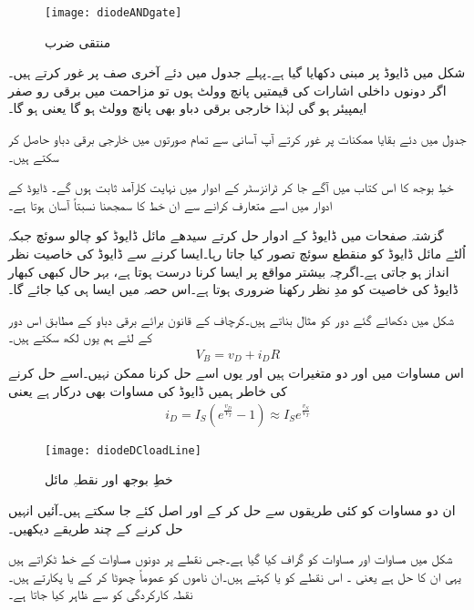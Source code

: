 \begin{figure}
\centering
\texttt{[image: diodeANDgate]}
\caption{منتقی ضرب}
\label{شکل_منتقی_ضرب}
\end{figure}
شکل  میں ڈایوڈ   پر مبنی   دکھایا گیا ہے۔پہلے جدول میں دئے آخری صف پر غور کرتے ہیں۔اگر دونوں داخلی اشارات کی قیمتیں پانچ وولٹ  ہوں تو مزاحمت میں برقی رو صفر ایمپیئر ہو گی لہٰذا خارجی برقی دباو بھی پانچ وولٹ ہو گا یعنی  ہو گا۔

جدول میں دئے بقایا ممکنات پر غور کرتے آپ آسانی سے تمام صورتوں میں خارجی برقی دباو حاصل کر سکتے ہیں۔


 \label{حصہ_یکسمتی_برقی_بار_کا_خط}
	خطِ بوجھ کا اس کتاب میں آگے جا کر ٹرانزسٹر کے ادوار میں  نہایت کارآمد ثابت ہوں گے۔ ڈایوڈ کے ادوار میں اسے متعارف کرانے سے ان خط کا سمجھنا نسبتاً آسان ہوتا ہے۔

گزشتہ صفحات میں ڈایوڈ کے ادوار حل کرتے سیدھے مائل ڈایوڈ کو چالو سوئچ جبکہ اُلٹے مائل ڈایوڈ کو منقطع سوئچ تصور کیا جاتا رہا۔ایسا کرنے سے ڈایوڈ کی خاصیت نظر انداز ہو جاتی ہے۔اگرچہ بیشتر مواقع پر ایسا کرنا درست ہوتا ہے، بہر حال کبھی کبھار ڈایوڈ کی خاصیت کو مدِ نظر رکھنا ضروری ہوتا ہے۔اس حصہ میں ایسا ہی کیا جائے گا۔

شکل   میں دکھائے گئے دور کو مثال بناتے ہیں۔کرچاف کے قانون برائے برقی دباو کے مطابق اس دور کے لئے ہم یوں لکھ سکتے ہیں۔
\begin{align} \label{مساوات_ڈایوڈ_بار_کا_خط}
V_B=v_D+i_D R
\end{align}
اس مساوات میں  اور  دو متغیرات ہیں اور یوں اسے حل کرنا ممکن نہیں۔اسے حل کرنے کی خاطر ہمیں ڈایوڈ کی مساوات بھی درکار ہے یعنی
\begin{align} \label{مساوات_ڈایوڈ_کا_خط_جس_پر_بار_لدا_جائے}
i_D=I_S \left (e^{\frac{v_D}{V_T}}-1 \right ) \approx I_S e^{\frac{v_S}{V_T}}
\end{align}
%
\begin{figure}
\centering
\texttt{[image: diodeDCloadLine]}
\caption{ خطِ بوجھ اور نقطہِ مائل}
\label{شکل_ڈایوڈ_بار_کا_خط}
\end{figure}
	ان دو مساوات کو کئی طریقوں سے حل کر کے  اور  اصل کئے جا سکتے ہیں۔آئیں انہیں حل کرنے کے چند طریقے دیکھیں۔

شکل  میں مساوات   اور مساوات   کو گراف کیا گیا ہے۔جس نقطے پر دونوں مساوات کے خط ٹکراتے ہیں یہی ان کا حل ہے یعنی ۔ اس نقطے کو  یا   کہتے ہیں۔ان ناموں کو عموماً چھوٹا کر کے  یا  پکارتے ہیں۔نقطہ کارکردگی کو  سے ظاہر کیا جاتا ہے۔

